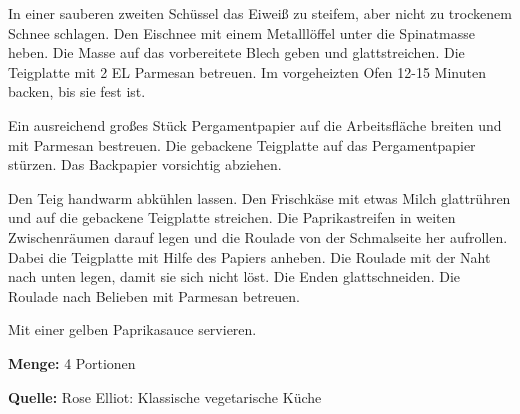 {In einer sauberen zweiten Schüssel das Eiweiß zu steifem, aber nicht zu trockenem Schnee schlagen. Den Eischnee mit einem Metalllöffel unter die Spinatmasse heben. Die Masse auf das vorbereitete Blech geben und glattstreichen. Die Teigplatte mit 2 EL Parmesan betreuen. Im vorgeheizten Ofen 12-15 Minuten backen, bis sie fest ist.

Ein ausreichend großes Stück Pergamentpapier auf die Arbeitsfläche breiten und mit Parmesan bestreuen. Die gebackene Teigplatte auf das Pergamentpapier stürzen. Das Backpapier vorsichtig abziehen.

Den Teig handwarm abkühlen lassen. Den Frischkäse mit etwas Milch glattrühren und auf die gebackene Teigplatte streichen. Die Paprikastreifen in weiten Zwischenräumen darauf legen und die Roulade von der Schmalseite her aufrollen. Dabei die Teigplatte mit Hilfe des Papiers anheben. Die Roulade mit der Naht nach unten legen, damit sie sich nicht löst. Die Enden glattschneiden. Die Roulade nach Belieben mit Parmesan betreuen.

Mit einer gelben Paprikasauce servieren.


{\bfseries Menge:} 4 Portionen

{\bfseries Quelle:} Rose Elliot: Klassische vegetarische Küche 

} 

